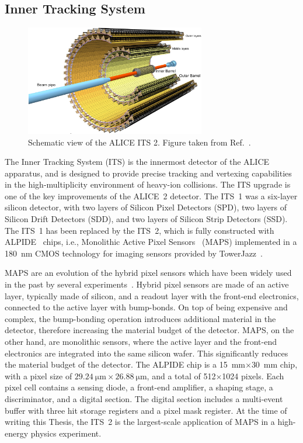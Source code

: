 \subsection{Inner Tracking System}
\begin{figure}[htb]
    \centering
    \includegraphics[width=0.7\textwidth]{Figures/Chapter 3/ITS_Scheme.png}
    \caption{Schematic view of the ALICE ITS 2. Figure taken from Ref.~\cite{ALICE:2023udb}.}
    \label{fig:ITS}
\end{figure}
The Inner Tracking System (ITS) is the innermost detector of the ALICE apparatus, and is designed to provide precise tracking and vertexing capabilities in the high-multiplicity environment of heavy-ion collisions. The ITS upgrade is one of the key improvements of the ALICE~2 detector. The ITS~1 was a six-layer silicon detector, with two layers of Silicon Pixel Detectors (SPD), two layers of Silicon Drift Detectors (SDD), and two layers of Silicon Strip Detectors (SSD). The ITS~1 has been replaced by the ITS~2, which is fully constructed with ALPIDE~\cite{AglieriRinella:2017lym} chips, i.e., Monolithic Active Pixel Sensors~\cite{Snoeys:2014daa} (MAPS) implemented in a 180~nm CMOS technology for imaging sensors provided by TowerJazz~\cite{Senyukov:2013se}.

MAPS are an evolution of the hybrid pixel sensors which have been widely used in the past by several experiments~\cite{ALICE:2008ngc,CMS:1997tlf,Aad:2008zz,Bediaga:2013tje}. Hybrid pixel sensors are made of an active layer, typically made of silicon, and a readout layer with the front-end electronics, connected to the active layer with bump-bonds. On top of being expensive and complex, the bump-bonding operation introduces additional material in the detector, therefore increasing the material budget of the detector. MAPS, on the other hand, are monolithic sensors, where the active layer and the front-end electronics are integrated into the same silicon wafer. This significantly reduces the material budget of the detector. The ALPIDE chip is a 15~mm$\times$30~mm chip, with a pixel size of $\SI{29.24}{\micro\meter}\times\SI{26.88}{\micro\meter}$, and a total of 512$\times$1024 pixels. Each pixel cell contains a sensing diode, a front-end amplifier, a shaping stage, a discriminator, and a digital section. The digital section includes a multi-event buffer with three hit storage registers and a pixel mask register. At the time of writing this Thesis, the ITS~2 is the largest-scale application of MAPS in a high-energy physics experiment.

